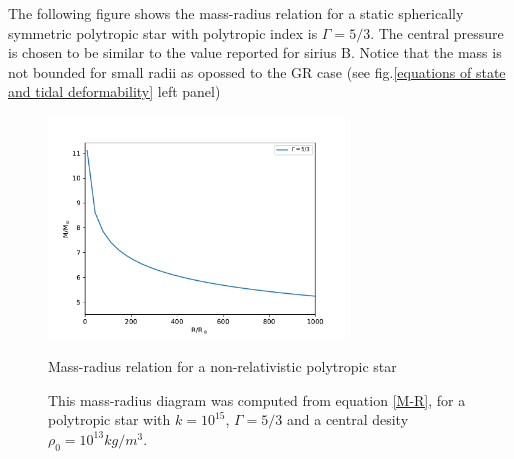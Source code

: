 The following figure shows the mass-radius relation for a static spherically symmetric polytropic star with polytropic index is $\Gamma=5/3$. The central pressure is chosen to be similar to the value reported for sirius B\cite{Holberg_1998}. Notice that the mass is not bounded for small radii as opossed to the GR case (see fig.\ref{equations of state and tidal deformability} left panel)



\begin{figure}[hbt!]
\begin{center}
\includegraphics[width=0.7\textwidth, angle=0]{images/polytrope_own.pdf}
\captionsetup{width=.8\textwidth}
\caption{Mass-radius relation for a non-relativistic polytropic star}
\caption*{This mass-radius diagram was computed from equation \ref{M-R}, for a polytropic star with $k=10^{15}$, $\Gamma=5/3$ and a central desity $\rho_0=10^{13}kg/m^3$.}
\label{polytropes1}
\end{center}
\end{figure}

\FloatBarrier
